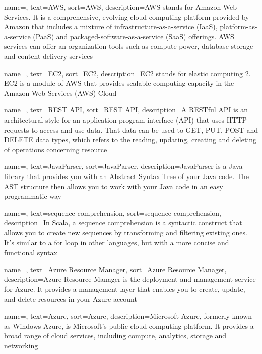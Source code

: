 {
    name=,
    text=AWS,
    sort=AWS,
    description={AWS stands for Amazon Web Services. It is a comprehensive, evolving cloud computing platform provided by Amazon that includes a mixture of infrastructure-as-a-service (IaaS), platform-as-a-service (PaaS) and packaged-software-as-a-service (SaaS) offerings. AWS services can offer an organization tools such as compute power, database storage and content delivery services}
}


{
    name=,
    text=EC2,
    sort=EC2,
    description={EC2 stands for elastic computing 2. EC2 is a module of AWS that provides scalable computing capacity in the Amazon Web Services (AWS) Cloud }
}

{
    name=,
    text=REST API,
    sort=REST API,
    description={A RESTful API is an architectural style for an application program interface (API) that uses HTTP requests to access and use data. That data can be used to GET, PUT, POST and DELETE data types, which refers to the reading, updating, creating and deleting of operations concerning resource}
}

{
    name=,
    text=JavaParser,
    sort=JavaParser,
    description={JavaParser is a Java library that provides you with an Abstract Syntax Tree of your Java code. The AST structure then allows you to work with your Java code in an easy programmatic way}
}

{
    name=,
    text=sequence comprehension,
    sort=sequence comprehension,
    description={In Scala, a sequence comprehension is a syntactic construct that allows you to create new sequences by transforming and filtering existing ones. It's similar to a for loop in other languages, but with a more concise and functional syntax }
}

{
    name=,
    text=Azure Resource Manager,
    sort=Azure Resource Manager,
    description={Azure Resource Manager is the deployment and management service for Azure. It provides a management layer that enables you to create, update, and delete resources in your Azure account
    }
}

{
    name=,
    text=Azure,
    sort=Azure,
    description={Microsoft Azure, formerly known as Windows Azure, is Microsoft's public cloud computing platform. It provides a broad range of cloud services, including compute, analytics, storage and networking}
}

